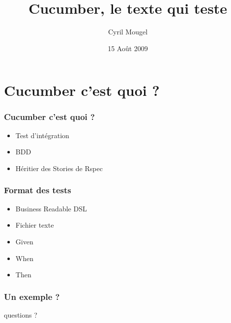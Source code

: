 \documentclass{beamer}
\title{Cucumber, le texte qui teste}
\author{Cyril Mougel}
\date{15 Août 2009}
\begin{document}
\begin{frame}
    \titlepage
\end{frame}

\section{Cucumber c'est quoi ?}

\begin{frame}
	\frametitle{Cucumber c'est quoi ?}
	\begin{itemize}
    \item Test d'intégration
    \item BDD
    \item Héritier des Stories de Rspec
	\end{itemize}
\end{frame}

\begin{frame}
    \frametitle{Format des tests}
    \begin{itemize}
        \item Business Readable DSL
        \item Fichier texte
        \item Given
        \item When
        \item Then
    \end{itemize}
\end{frame}

\begin{frame}
  \frametitle{Un exemple ?}
  \begin{center}
    
  \end{center}
\end{frame}

\begin{frame}
    \begin{center}
    \huge{}
    questions ?
    \end{center}
\end{frame}
\end{document}
